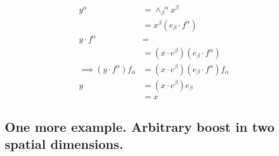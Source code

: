 \documentclass[iop,tighten]{emulateapj}
\begin{document}
\begin{align*}
y^\alpha 
&= {\wedge_\beta}^\alpha x^\beta \\
&= x^\beta (e_\beta \cdot f^\alpha) \\
y \cdot f^\alpha &= \\
&=(x \cdot e^\beta) (e_\beta \cdot f^\alpha) \\
\implies
(y \cdot f^\alpha) f_\alpha &= (x \cdot e^\beta) (e_\beta \cdot f^\alpha) f_\alpha \\
y 
&= (x \cdot e^\beta) e_\beta \\
&= x 
\end{align*}

\subsection{One more example.  Arbitrary boost in two spatial dimensions.}

%
%
%

\end{document}
